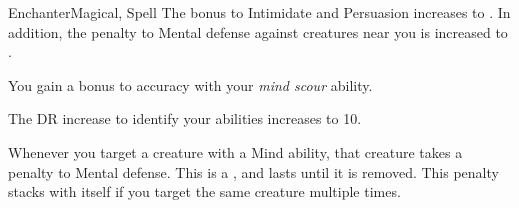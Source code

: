 \begin{feat}{Enchanter}{Magical, Spell}
         The bonus to Intimidate and Persuasion increases to .
        In addition, the penalty to Mental defense against creatures near you is increased to .

         You gain a  bonus to accuracy with your \textit{mind scour} ability.

         The DR increase to identify your  abilities increases to 10.

         Whenever you target a creature with a Mind ability, that creature takes a  penalty to Mental defense.
        This is a , and lasts until it is removed.
        This penalty stacks with itself if you target the same creature multiple times.
    \end{feat}

